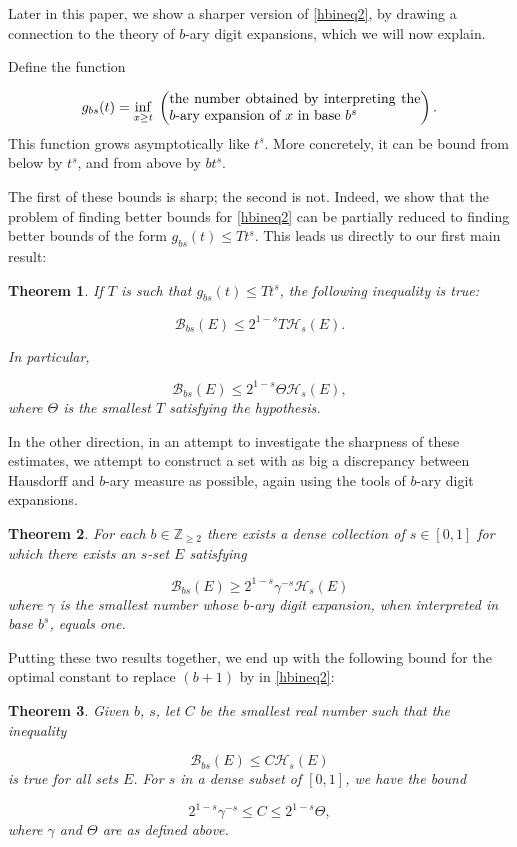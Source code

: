 \documentclass[11pt, reqno]{amsart}
\newcommand{\Z}{\mathbb{Z}}
\newcommand{\HH}{\mathcal{H}}
\newcommand{\BB}{\mathcal{B}}
\newtheorem{theorem}{Theorem}
\begin{document}
Later in this paper, we show a sharper version of \eqref{hbineq2}, by drawing a connection to the theory of $b$-ary digit expansions, which we will now explain. 

Define the function

\[ g_{bs} (t) = \inf_{x \geq t}\;\left(\parbox{18em}{the number obtained by interpreting the $b$-ary expansion of $x$ in base $b^s$}\right).\]
This function grows asymptotically like $t^s$. More concretely, it can be bound from below by $t^s$, and from above by $b t^s$.

The first of these bounds is sharp; the second is not. Indeed, we show that the problem of finding better bounds for \eqref{hbineq2} can be partially reduced to finding better bounds of the form $g_{bs}(t) \leq T t^s$. This leads us directly to our first main result:

\begin{theorem}
If $T$ is such that $g_{bs}(t) \leq T t^s$, the following inequality is true:

\[\BB_{bs}(E) \leq 2^{1-s} T \HH_s(E).\]

In particular,

\[\BB_{bs}(E) \leq 2^{1-s} \Theta \HH_s(E),\]
where $\Theta$ is the smallest $T$ satisfying the hypothesis.
\end{theorem}

In the other direction, in an attempt to investigate the sharpness of these estimates, we attempt to construct a set with as big a discrepancy between Hausdorff and $b$-ary measure as possible, again using the tools of $b$-ary digit expansions.

\begin{theorem}\label{clowerbound}
For each $b \in \Z_{\geq 2}$ there exists a dense collection of $s \in [0,1]$ for which there exists an $s$-set $E$ satisfying

\[\BB_{bs}(E) \geq 2^{1-s} \gamma^{-s} \HH_s(E)\]
where $\gamma$ is the smallest number whose $b$-ary digit expansion, when interpreted in base $b^s$, equals one.
\end{theorem}

Putting these two results together, we end up with the following bound for the optimal constant to replace $(b+1)$ by in \eqref{hbineq2}:

\begin{theorem}\label{cbounds}
Given $b$, $s$, let $C$ be the smallest real number such that the inequality

\[\BB_{bs}(E) \leq C \HH_s(E)\]
is true for all sets $E$. For $s$ in a dense subset of $[0,1]$, we have the bound

\[2^{1-s} \gamma^{-s} \leq C \leq 2^{1-s} \Theta,\]
where $\gamma$ and $\Theta$ are as defined above.
\end{theorem}
\end{document}
